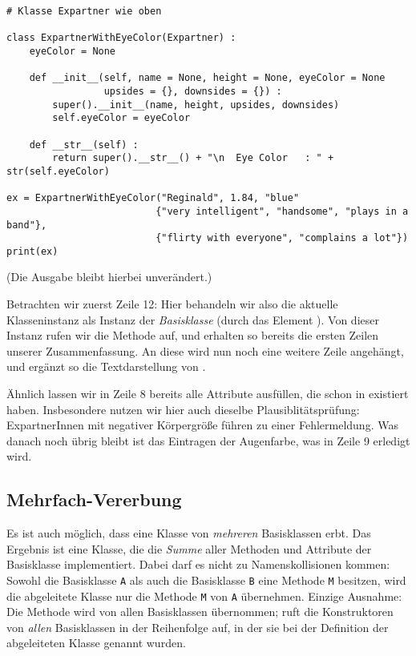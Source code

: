 \begin{codebox}
\begin{verbatim}
# Klasse Expartner wie oben

class ExpartnerWithEyeColor(Expartner) :
    eyeColor = None
    
    def __init__(self, name = None, height = None, eyeColor = None
                 upsides = {}, downsides = {}) :
        super().__init__(name, height, upsides, downsides)
        self.eyeColor = eyeColor
        
    def __str__(self) :
        return super().__str__() + "\n  Eye Color   : " + str(self.eyeColor)

ex = ExpartnerWithEyeColor("Reginald", 1.84, "blue"
                          {"very intelligent", "handsome", "plays in a band"},
                          {"flirty with everyone", "complains a lot"})
print(ex)
\end{verbatim}
\end{codebox}
(Die Ausgabe bleibt hierbei unverändert.)

Betrachten wir zuerst Zeile 12: Hier behandeln wir also die aktuelle Klasseninstanz  als Instanz der \emph{Basisklasse}   (durch das Element ). Von dieser Instanz rufen wir die Methode  auf, und erhalten so bereits die ersten Zeilen unserer Zusammenfassung. An diese wird nun noch eine weitere Zeile angehängt, und ergänzt so die Textdarstellung von .

Ähnlich lassen wir in Zeile 8 bereits alle Attribute ausfüllen, die schon in  existiert haben. Insbesondere nutzen wir hier auch dieselbe Plausiblitätsprüfung: ExpartnerInnen mit negativer Körpergröße führen zu einer Fehlermeldung. Was danach noch übrig bleibt ist das Eintragen der Augenfarbe, was in Zeile 9 erledigt wird.


\subsection{Mehrfach-Vererbung}
Es ist auch möglich, dass eine Klasse von \emph{mehreren} Basisklassen erbt. Das Ergebnis ist eine Klasse, die die \emph{Summe} aller Methoden und Attribute der Basisklasse implementiert. Dabei darf es nicht zu Namenskollisionen kommen: Sowohl die Basisklasse \texttt{A} als auch die Basisklasse \texttt{B} eine Methode \texttt{M} besitzen, wird die abgeleitete Klasse  nur die Methode \texttt{M} von \texttt{A} übernehmen. Einzige Ausnahme: Die Methode  wird von allen Basisklassen übernommen;  ruft die Konstruktoren von \emph{allen} Basisklassen in der Reihenfolge auf, in der sie bei der Definition der abgeleiteten Klasse genannt wurden.

